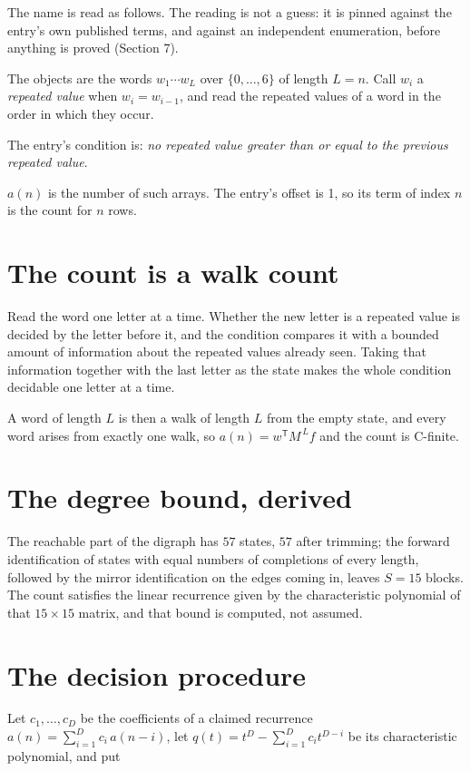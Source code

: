 \documentclass[11pt]{article}
\theoremstyle{definition}
\begin{document}
The name is read as follows. The reading is not a guess: it is pinned against the entry's own published terms, and against an independent enumeration, before anything is proved (Section 7).

The objects are the words $w_1\cdots w_L$ over $\{0,\dots,6\}$ of length $L = n$. Call $w_i$ a {\itshape repeated value} when $w_i = w_{i-1}$, and read the repeated values of a word in the order in which they occur.

The entry's condition is: {\itshape no repeated value greater than or equal to the previous repeated value}.

$a(n)$ is the number of such arrays. The entry's offset is 1, so its term of index $n$ is the count for $n$ rows.

\section{The count is a walk count}

Read the word one letter at a time. Whether the new letter is a repeated value is decided by the letter before it, and the condition compares it with a bounded amount of information about the repeated values already seen. Taking that information together with the last letter as the state makes the whole condition decidable one letter at a time.

A word of length $L$ is then a walk of length $L$ from the empty state, and every word arises from exactly one walk, so $a(n) = w^{\mathsf T}M^{\,L}f$ and the count is C-finite.

\section{The degree bound, derived}

The reachable part of the digraph has $57$ states, $57$ after trimming; the forward identification of states with equal numbers of completions of every length, followed by the mirror identification on the edges coming in, leaves $S = 15$ blocks. The count satisfies the linear recurrence given by the characteristic polynomial of that $15\times15$ matrix, and that bound is computed, not assumed.

\section{The decision procedure}

Let $c_1,\dots,c_D$ be the coefficients of a claimed recurrence $a(n) = \sum_{i=1}^{D} c_i\,a(n-i)$, let $q(t) = t^{D} - \sum_{i=1}^{D} c_i t^{D-i}$ be its characteristic polynomial, and put
\end{document}
